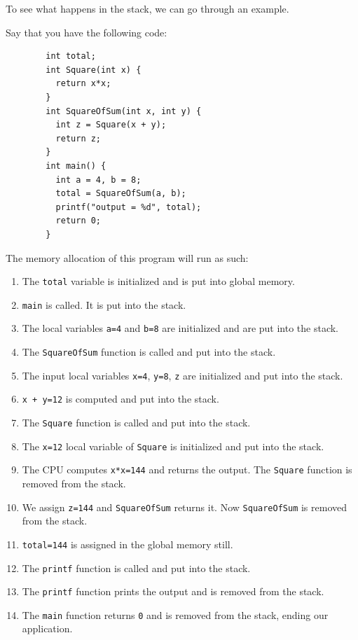 \documentclass{article}
\begin{document}
    To see what happens in the stack, we can go through an example. 

    \begin{example}
      Say that you have the following code: 

      \begin{lstlisting} 
        int total; 
        int Square(int x) {
          return x*x; 
        }
        int SquareOfSum(int x, int y) {
          int z = Square(x + y); 
          return z; 
        }
        int main() { 
          int a = 4, b = 8;              
          total = SquareOfSum(a, b); 
          printf("output = %d", total); 
          return 0; 
        }
      \end{lstlisting}
      
      The memory allocation of this program will run as such: 
      \begin{enumerate} 
        \item The \texttt{total} variable is initialized and is put into global memory. 
        \item \texttt{main} is called. It is put into the stack. 
        \item The local variables \texttt{a=4} and \texttt{b=8} are initialized and are put into the stack. 
        \item The \texttt{SquareOfSum} function is called and put into the stack. 
        \item The input local variables \texttt{x=4}, \texttt{y=8}, \texttt{z} are initialized and put into the stack. 
        \item \texttt{x + y=12} is computed and put into the stack. 
        \item The \texttt{Square} function is called and put into the stack. 
        \item The \texttt{x=12} local variable of \texttt{Square} is initialized and put into the stack. 
        \item The CPU computes \texttt{x*x=144} and returns the output. The \texttt{Square} function is removed from the stack. 
        \item We assign \texttt{z=144} and \texttt{SquareOfSum} returns it. Now \texttt{SquareOfSum} is removed from the stack. 
        \item \texttt{total=144} is assigned in the global memory still. 
        \item The \texttt{printf} function is called and put into the stack. 
        \item The \texttt{printf} function prints the output and is removed from the stack. 
        \item The \texttt{main} function returns \texttt{0} and is removed from the stack, ending our application. 
      \end{enumerate}
    \end{example}
\end{document}
